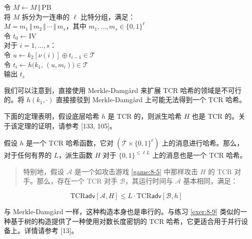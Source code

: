 \begin{snote}[用于长输入的目标抗碰撞性。]
\hspace*{5pt} 令 $M\leftarrow M\,\Vert\,\mathrm{PB}$\\
\hspace*{26pt} 将 $M$ 拆分为一连串的 $\ell$ 比特分组，满足：\\
\hspace*{70pt} $M=m_1\,\Vert\,m_2\,\Vert\,\cdots\,\Vert\,m_s$，其中 $m_1,\dots,m_s\in\{0,1\}^\ell$\\
\hspace*{26pt} 令 $t_0\leftarrow\mathrm{IV}$\\
\hspace*{26pt} 对于 $i=1,\dots,s$：\\
\hspace*{50pt} 令 $u\leftarrow k_2[\nu(i)]\oplus t_{i-1}\in\mathcal{T}$\\
\hspace*{50pt} 令 $t_i\leftarrow h\big(k_1,\,(u,m_i)\big)\in\mathcal{T}$\\
\hspace*{26pt} 输出 $t_s$

\vspace{5pt}

\noindent
我们可以注意到，直接使用 Merkle-Damg{\aa}rd 来扩展 TCR 哈希的领域是不可行的。将 $h(k_1,\cdot)$ 直接接驳到 Merkle-Damg{\aa}rd 上可能无法得到一个 TCR 哈希。
\end{snote}

\begin{snote}[派生哈希的安全性。]
下面的定理表明，假设底层哈希 $h$ 是 TCR 的，则派生哈希 $H$ 也是 TCR 的。关于该定理的证明，请参考 [133, 105]。
\end{snote}

\begin{theorem}\label{theo:8-13}
假设 $h$ 是一个 TCR 哈希函数，它对 $(\mathcal{T}\times\{0,1\}^\ell)$ 上的消息进行哈希。那么，对于任何有界的 $L$，派生函数 $H$ 对于 $\{0,1\}^{\leq\ell L}$ 上的消息也是一个 TCR 哈希。
\begin{quote}
特别地，假设 $\mathcal{A}$ 是一个如攻击游戏 \ref{game:8-5} 中那样攻击 $H$ 的 TCR 对手。那么，存在一个 TCR 对手 $\mathcal{B}$，其运行时间与 $\mathcal{A}$ 基本相同，满足：
\end{quote}
\[
\mathrm{TCR}\mathsf{adv}[\mathcal{A},H]
\leq
L\cdot\mathrm{TCR}\mathsf{adv}[\mathcal{B},h]
\]
\end{theorem}

与 Merkle-Damg{\aa}rd 一样，这种构造本身也是串行的。与练习 \ref{exer:8-9} 类似的一种基于树的构造提供了一种使用对数长度密钥的 TCR 哈希，它更适合用于并行设备上。详情请参考 [13]。

